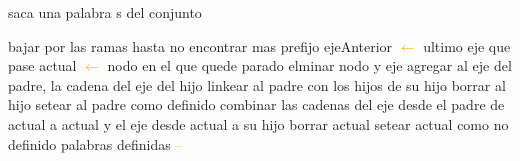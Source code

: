 \begin{algorithm}[H]
\caption{saca una palabra s del conjunto}
\begin{algorithmic}[1]
\STATE bajar por las ramas hasta no encontrar mas prefijo
\STATE ejeAnterior \textcolor{orange}{$\leftarrow$} ultimo eje que pase
\STATE actual \textcolor{orange}{$\leftarrow$} nodo en el que quede parado
		\STATE elminar nodo y eje
		 \STATE {}
		\STATE agregar al eje del padre, la cadena del eje del hijo
		\STATE linkear al padre con los hijos de su hijo
		\STATE borrar al hijo
		\STATE setear al padre como definido
		\ENDIF
	\ELSE
		\STATE {}
		\STATE combinar las cadenas del eje desde el padre de actual a actual y el eje desde actual a su hijo 
		\STATE borrar actual
		\ELSE
				\STATE {}
				\STATE setear actual como no definido
		\ENDIF
	\ENDIF
	\STATE palabras definidas \textcolor{orange}{--}
\ENDIF
\end{algorithmic}
\end{algorithm}		